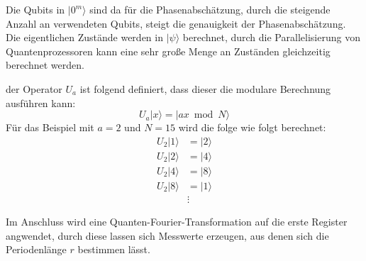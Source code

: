 Die Qubits in $|0^m\rangle$ sind da für die Phasenabschätzung, durch die steigende Anzahl an verwendeten Qubits, steigt die genauigkeit der Phasenabschätzung.
Die eigentlichen Zustände werden in $|\psi\rangle$ berechnet, durch die Parallelisierung von Quantenprozessoren kann eine sehr große Menge an Zuständen gleichzeitig berechnet werden.

der Operator $U_a$ ist folgend definiert, dass dieser die modulare Berechnung ausführen kann:
\begin{equation}
    U_a|x\rangle=|ax \bmod N\rangle
\end{equation}
Für das Beispiel mit $a=2$ und $N=15$ wird die folge wie folgt berechnet:
\begin{align*}
U_2|1\rangle&=|2\rangle\\
U_2|2\rangle&=|4\rangle\\
U_2|4\rangle&=|8\rangle\\
U_2|8\rangle&=|1\rangle\\
&\vdots
\end{align*}

Im Anschluss wird eine Quanten-Fourier-Transformation auf die erste Register angwendet, durch diese lassen sich Messwerte erzeugen, aus denen sich die Periodenlänge $r$ bestimmen lässt.